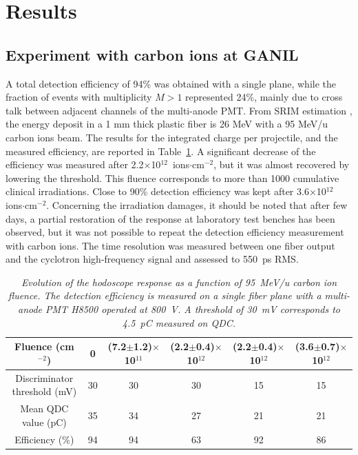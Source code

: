 \documentclass[a4paper,11pt]{article}
\begin{document}
\section{Results}
\label{Results}
\subsection{Experiment with carbon ions at GANIL}
A total detection efficiency of 94\% was obtained with a single plane, while the fraction of events with multiplicity $M>1$ represented 24\%, mainly due to cross talk between adjacent channels of the multi-anode PMT.
From SRIM estimation \cite{Ziegler2010}, the energy deposit in a 1 mm thick plastic fiber is 26 MeV with a 95 MeV/u carbon ions beam. The results for the integrated charge per projectile, and the measured efficiency, are reported in Table~\ref{tab:GANIL}. A significant decrease of the efficiency was measured after 2.2$\times$10$^{12}$~ions$\cdot$cm$^{-2}$, but it was almost recovered by lowering the threshold. This fluence corresponds to more than 1000 cumulative clinical irradiations. 
Close to 90\% detection efficiency was kept after 3.6$\times$10$^{12}$ ions$\cdot$cm$^{-2}$.
Concerning the irradiation damages, it should be noted that after few days, a partial restoration of the response at laboratory test benches has been observed, but it was not possible to repeat the detection efficiency measurement with carbon ions. 
The time resolution was measured between one fiber output and the cyclotron high-frequency signal and assessed to 550~ps RMS. 
\begin{table}[htb]
\caption{\small{\textit{Evolution of the hodoscope response as a function of 95~MeV/u carbon ion fluence. The detection efficiency is measured on a single fiber plane with a multi-anode PMT H8500 operated at 800~V. A threshold of 30~mV corresponds to 4.5~pC measured on QDC.}}}
\centering
\begin{tabular}{|c|c|c|c|c|c|}
\hline
Fluence (cm$^{-2}$)& 0 & (7.2$\pm$1.2)$\times$10$^{11}$ & (2.2$\pm$0.4)$\times$10$^{12}$ & (2.2$\pm$0.4)$\times$10$^{12}$ & (3.6$\pm$0.7)$\times$10$^{12}$\\
\hline
\makecell{Discriminator\\threshold (mV)} & 30 & 30 & 30 & 15 & 15\\
\hline
\makecell{Mean QDC\\value (pC)} & 35 & 34 & 27 & 21 & 21\\
\hline
Efficiency (\%) & 94 & 94 & 63 & 92 & 86\\
\hline
\end{tabular}
\label{tab:GANIL}
\end{table}
\end{document}
